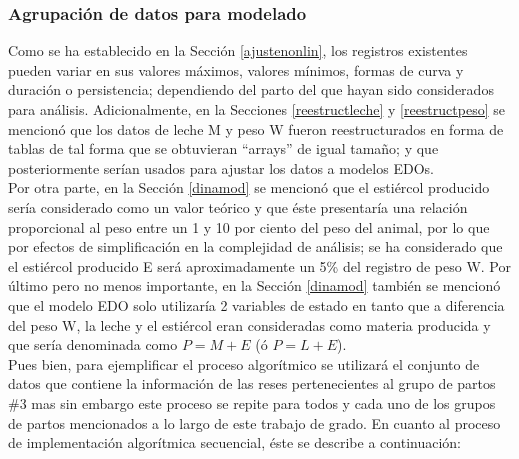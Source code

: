 \subsubsection{Agrupación de datos para modelado}

Como se ha establecido en la Sección \ref{ajustenonlin}, los registros existentes pueden variar en sus valores máximos, valores mínimos, formas de curva y duración o persistencia; dependiendo del parto del que hayan sido considerados para análisis. Adicionalmente, en la Secciones \ref{reestructleche} y \ref{reestructpeso} se mencionó que los datos de leche M y peso W fueron reestructurados en forma de tablas de tal forma que se obtuvieran ``arrays'' de igual tamaño; y que posteriormente serían usados para ajustar los datos a modelos EDOs.\\

Por otra parte, en la Sección \ref{dinamod} se mencionó que el estiércol producido sería considerado como un valor teórico y que éste presentaría una relación proporcional al peso entre un 1 y 10 por ciento del peso del animal, por lo que por efectos de simplificación en la complejidad de análisis; se ha considerado que el estiércol producido E será aproximadamente un 5\% del registro de peso W. Por último pero no menos importante, en la Sección \ref{dinamod} también se mencionó que el modelo EDO solo utilizaría 2 variables de estado en tanto que a diferencia del peso W, la leche y el estiércol eran consideradas como materia producida y que sería denominada como $P=M+E$ (ó $P=L+E$).\\

Pues bien, para ejemplificar el proceso algorítmico se utilizará el conjunto de datos que contiene la información de las reses pertenecientes al grupo de partos \#3 mas sin embargo este proceso se repite para todos y cada uno de los grupos de partos mencionados a lo largo de este trabajo de grado. En cuanto al proceso de implementación algorítmica secuencial, éste se describe a continuación:

